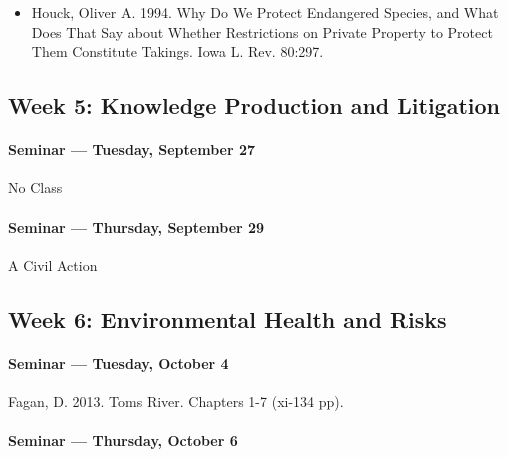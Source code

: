     \begin{itemize}
    \item Houck, Oliver A. 1994. Why Do We Protect Endangered Species, and What Does That Say about Whether Restrictions on Private Property to Protect Them Constitute Takings. Iowa L. Rev. 80:297.
    \end{itemize}
    
    
    \subsection{\textbf{Week 5}: Knowledge Production and Litigation}
    
    \paragraph{Seminar --- Tuesday, September 27}		
    
    
    No Class  %
    

      
      \paragraph{Seminar --- Thursday, September 29}
      
      \begin{itemize*}
      \item A Civil Action
      \end{itemize*}
      

      
      \subsection{\textbf{Week 6}: Environmental Health and Risks}
      
      \paragraph{Seminar --- Tuesday, October 4}
      
      \begin{itemize*}
      \item Fagan, D. 2013. Toms River. Chapters 1-7 (xi-134 pp).
      \end{itemize*}
      

      
      \paragraph{Seminar --- Thursday, October 6}
      
